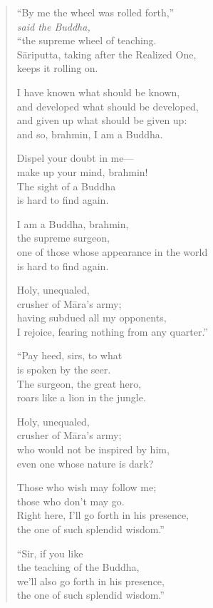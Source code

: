 \documentclass[12pt,openany]{book}%
\newcommand*{\scspeaker}[1]{\hspace{2em}\textit{#1}}
\begin{document}
\begin{verse}
“By me the wheel was rolled forth,” \\
\scspeaker{said the Buddha, }\\
“the supreme wheel of teaching. \\
\textsanskrit{Sāriputta}, taking after the Realized One, \\
keeps it rolling on. 

I have known what should be known, \\
and developed what should be developed, \\
and given up what should be given up: \\
and so, brahmin, I am a Buddha. 

Dispel your doubt in me—\\
make up your mind, brahmin! \\
The sight of a Buddha \\
is hard to find again. 

I am a Buddha, brahmin, \\
the supreme surgeon, \\
one of those whose appearance in the world \\
is hard to find again. 

Holy, unequaled, \\
crusher of \textsanskrit{Māra}’s army; \\
having subdued all my opponents, \\
I rejoice, fearing nothing from any quarter.” 

“Pay heed, sirs, to what \\
is spoken by the seer. \\
The surgeon, the great hero, \\
roars like a lion in the jungle. 

Holy, unequaled, \\
crusher of \textsanskrit{Māra}’s army; \\
who would not be inspired by him, \\
even one whose nature is dark? 

Those who wish may follow me; \\
those who don’t may go. \\
Right here, I’ll go forth in his presence, \\
the one of such splendid wisdom.” 

“Sir, if you like \\
the teaching of the Buddha, \\
we’ll also go forth in his presence, \\
the one of such splendid wisdom.” 


\end{verse}
\end{document}
